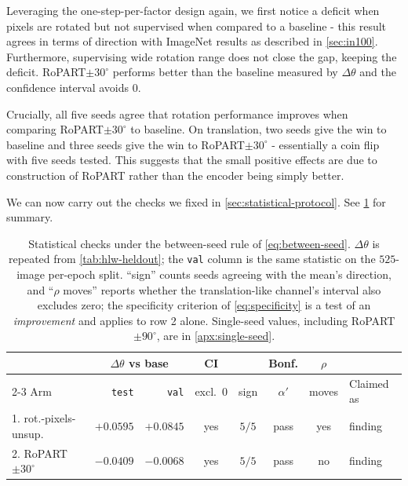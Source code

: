 \documentclass[final_report.tex]{subfiles}
\begin{document}
Leveraging the one-step-per-factor design again, we first notice a deficit when pixels are rotated but not supervised when compared to a baseline - this result agrees in terms of direction with ImageNet results as described in \cref{sec:in100}. Furthermore, supervising wide rotation range does not close the gap, keeping the deficit. RoPART$\pm30^\circ$ performs better than the baseline measured by $\Delta\theta$ and the confidence interval avoids $0$.

Crucially, all five seeds agree that rotation performance improves when comparing RoPART$\pm30^\circ$ to baseline. On translation, two seeds give the win to baseline and three seeds give the win to RoPART$\pm30^\circ$ - essentially a coin flip with five seeds tested. This suggests that the small positive effects are due to construction of RoPART rather than the encoder being simply better.

We can now carry out the checks we fixed in \cref{sec:statistical-protocol}. See \cref{tab:hlw-claims} for summary.

\begin{table}[htbp]
  \centering
  \caption[What each held-out comparison supports]{Statistical checks under the
  between-seed rule of \cref{eq:between-seed}. $\Delta\theta$ is repeated from
  \cref{tab:hlw-heldout}; the \texttt{val} column is the same statistic on the $525$-image
  per-epoch split. ``sign'' counts seeds agreeing with the mean's direction, and ``$\rho$
  moves'' reports whether the translation-like channel's interval also excludes zero; the
  specificity criterion of \cref{eq:specificity} is a test of an \emph{improvement} and
  applies to row 2 alone. Single-seed values, including RoPART $\pm 90^\circ$, are in
  \cref{apx:single-seed}.}
  \label{tab:hlw-claims}
  \footnotesize
  \begin{tabular}{@{}l r r c c c c l@{}}
    \toprule
    & \multicolumn{2}{c}{$\Delta\theta$ vs base} & CI & & Bonf. & $\rho$ & \\
    \cmidrule(lr){2-3}
    Arm & \texttt{test} & \texttt{val} & excl.\ 0 & sign & $\alpha'$ & moves & Claimed as \\
    \midrule
    1. rot.-pixels-unsup.
      & $+0.0595$ & $+0.0845$ & yes & $5/5$ & pass & yes  & finding \\
    2. RoPART $\pm 30^\circ$
      & $-0.0409$ & $-0.0068$ & yes & $5/5$ & pass & no   & finding \\
    \bottomrule
  \end{tabular}
\end{table}
\end{document}
